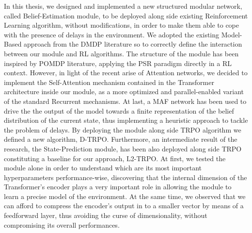         In this thesis, we designed and implemented a new structured modular network, called Belief-Estimation module, to be deployed along side existing Reinforcement Learning algorithm, without modifications, in order to make them able to cope with the presence of delays in the environment. We adopted the existing Model-Based approach from the DMDP literature so to correctly define the interaction between our module and RL algorithms. The structure of the module has been inspired by POMDP literature, applying the PSR paradigm directly in a RL context. However, in light of the recent arise of Attention networks, we decided to implement the Self-Attention mechanism contained in the Transformer architecture inside our module, as a more optimized and parallel-enabled variant of the standard Recurrent mechanisms. At last, a MAF network has been used to drive the the output of the model towards a finite representation of the belief distribution of the current state, thus implementing a heuristic approach to tackle the problem of delays. By deploying the module along side TRPO algorithm we defined a new algorithm, D-TRPO. Furthermore, an intermediate result of the research, the State-Prediction module, has been also deployed along side TRPO constituting a baseline for our approach, L2-TRPO. \newline
        At first, we tested the module alone in order to understand which are its most important hyperparameters performance-wise, discovering that the internal dimension of the Transformer's encoder plays a very important role in allowing the module to learn a precise model of the environment. At the same time, we observed that we can afford to compress the encoder's output in to a smaller vector by means of a feedforward layer, thus avoiding the curse of dimensionality, without compromising its overall performances. \newline
